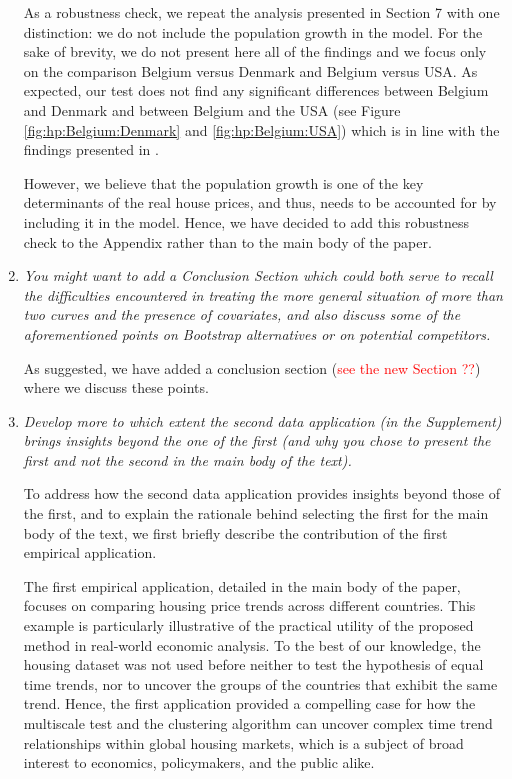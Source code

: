 \documentclass[a4paper,12pt]{article}
\begin{document}
\begin{enumerate}[label=\arabic*.,leftmargin=0.6cm]
As a robustness check, we repeat the analysis presented in Section 7 with one distinction: we do not include the population growth in the model. For the sake of brevity, we do not present here all of the findings and we focus only on the comparison Belgium versus Denmark and Belgium versus USA. As expected, our test does not find any significant differences between Belgium and Denmark and between Belgium and the USA (see Figure \ref{fig:hp:Belgium:Denmark} and \ref{fig:hp:Belgium:USA}) which is in line with the findings presented in \cite{Knoll2017}.

However, we believe that the population growth is one of the key determinants of the real house prices, and thus, needs to be accounted for by including it in the model. Hence, we have decided to add this robustness check to the Appendix rather than to the main body of the paper.

\item \textit{You might want to add a Conclusion Section which could both serve to recall the difficulties encountered in treating the more general situation of more than two curves and the presence of
covariates, and also discuss some of the aforementioned points on Bootstrap alternatives or on potential competitors.}  

As suggested, we have added a conclusion section (\textcolor{red}{see the new Section ??}) where we discuss these points. 


\item \textit{Develop more to which extent the second data application (in the Supplement) brings insights beyond the one of the first (and why you chose to present the first and not the second in the main body of the text).}

To address how the second data application provides insights beyond those of the first, and to explain the rationale behind selecting the first for the main body of the text, we first briefly describe the contribution of the first empirical application.

The first empirical application, detailed in the main body of the paper, focuses on comparing housing price trends across different countries. This example is particularly illustrative of the practical utility of the proposed method in real-world economic analysis. To the best of our knowledge, the housing dataset was not used before neither to test the hypothesis of equal time trends, nor to uncover the groups of the countries that exhibit the same trend. Hence, the first application provided a compelling case for how the multiscale test and the clustering algorithm can uncover complex time trend relationships within global housing markets, which is a subject of broad interest to economics, policymakers, and the public alike.


\end{enumerate}
\end{document}
